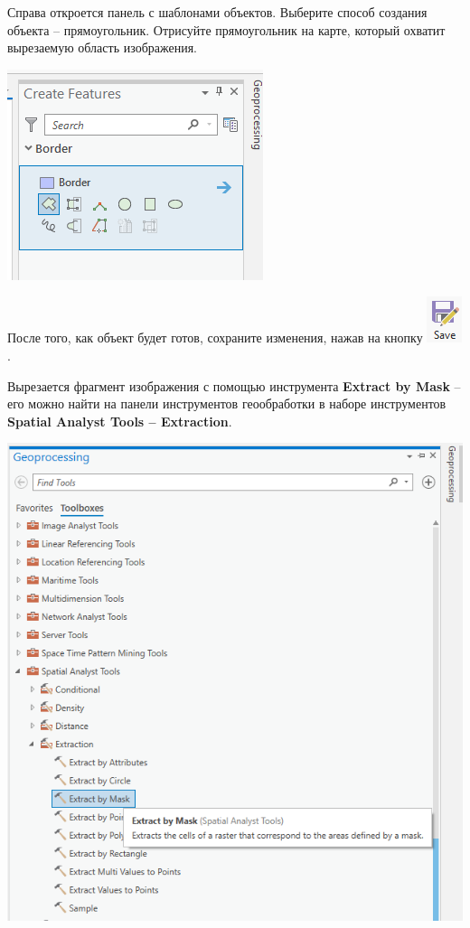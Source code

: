 \documentclass[
  12pt,
]{book}
\begin{document}
Справа откроется панель с шаблонами объектов. Выберите способ создания объекта -- прямоугольник. Отрисуйте прямоугольник на карте, который охватит вырезаемую область изображения.

\includegraphics{images/Ref01/Rectangles.png}

После того, как объект будет готов, сохраните изменения, нажав на кнопку \includegraphics{images/Ref01/Save_edits.png}.

Вырезается фрагмент изображения с помощью инструмента \textbf{Extract by Mask} -- его можно найти на панели инструментов геообработки в наборе инструментов \textbf{Spatial Analyst Tools -- Extraction}.

\includegraphics{images/Ref01/Extract_by_Mask.png}
\end{document}
